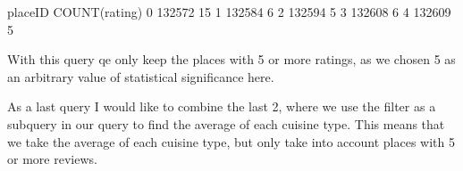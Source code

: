 \documentclass[letterpaper,10pt,english]{jupyterBook}
\begin{document}
\begin{sphinxVerbatim}[commandchars=\\\{\}]
   placeID  COUNT(rating)
0   132572             15
1   132584              6
2   132594              5
3   132608              6
4   132609              5
\end{sphinxVerbatim}

\sphinxAtStartPar
With this query qe only keep the places with 5 or more ratings, as we chosen 5 as an arbitrary value of statistical significance here.

\sphinxAtStartPar
As a last query I would like to combine the last 2, where we use the filter as a subquery in our query to find the average of each cuisine type.
This means that we take the average of each cuisine type, but only take into account places with 5 or more reviews.

\begin{sphinxVerbatim}[commandchars=\\\{\}]
  
\end{sphinxVerbatim}
\end{document}
